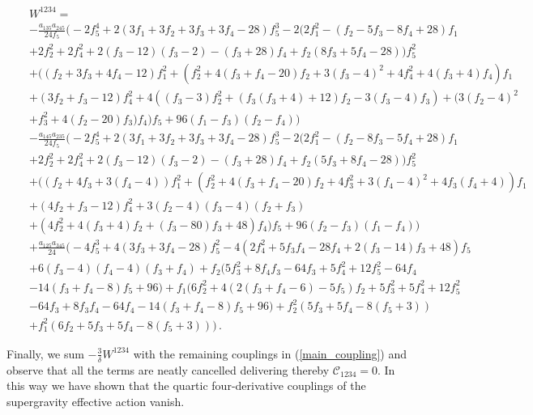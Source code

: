 \documentclass[12pt,a4paper]{article}
\numberwithin{equation}{section}
\newcommand{\bea}{\begin{eqnarray}}
\newcommand{\eea}{\end{eqnarray}}
\def\la{\label}
\def\la{\label}
\begin{document}
{\small
\bea
 &&W^{1234}= \nonumber\\
 && -\frac{a_{135} a_{245} }{24
   f_5}\Big(-2 f_5^4+2 (3 f_1+3 f_2+3 f_3+3 f_4-28) f_5^3-2 (2
   f_1^2-(f_2-5 f_3-8 f_4+28) f_1 \nonumber \\
   &&+2 f_2^2+2 f_4^2+2 (f_3-12)
   (f_3-2)-(f_3+28) f_4+f_2 (8 f_3+5 f_4-28))
   f_5^2  \nonumber  \\
   &&+((f_2+3 f_3+4 f_4-12) f_1^2+(f_2^2+4 (f_3+f_4-20) f_2+3
   (f_3-4)^2+4 f_4^2+4 (f_3+4) f_4) f_1  \nonumber  \\
   &&+(3 f_2+f_3-12)
   f_4^2+4 ((f_3-3) f_2^2+(f_3 (f_3+4)+12) f_2-3
   (f_3-4) f_3)+(3 (f_2-4)^2 \nonumber  \\
   &&+f_3^2+4 (f_2-20)
   f_3) f_4) f_5+96 (f_1-f_3) (f_2-f_4)\Big)   \nonumber \\
   &&-\frac{a_{145} a_{235}}{24 f_5} \Big(-2 f_5^4+2 (3 f_1+3 f_2+3 f_3+3 f_4-28) f_5^3-2
   (2 f_1^2-(f_2-8 f_3-5 f_4+28) f_1 \nonumber \\
   &&+2 f_2^2+2 f_4^2+2 (f_3-12)
   (f_3-2)-(f_3+28) f_4+f_2 (5 f_3+8 f_4-28))
   f_5^2 \nonumber \\
   &&+((f_2+4 f_3+3 (f_4-4)) f_1^2+(f_2^2+4
   (f_3+f_4-20) f_2+4 f_3^2+3 (f_4-4)^2+4 f_3 (f_4+4))
   f_1 \nonumber \\
   &&+(4 f_2+f_3-12) f_4^2+3 (f_2-4) (f_3-4)
   (f_2+f_3) \nonumber \\
   &&+(4 f_2^2+4 (f_3+4) f_2+(f_3-80) f_3+48)
   f_4) f_5+96 (f_2-f_3) (f_1-f_4)\Big) \nonumber \\
  &&+\frac{  a_{125} a_{345}}{24}
  \Big(-4 f_5^3+4 (3 f_3+3 f_4-28) f_5^2-4 (2 f_4^2+5 f_3
   f_4-28 f_4+2 (f_3-14) f_3+48) f_5 \nonumber \\
   &&+6 (f_3-4) (f_4-4)
   (f_3+f_4)+f_2 (5 f_3^2+8 f_4 f_3-64 f_3+5 f_4^2+12 f_5^2-64 f_4 \nonumber \\
   &&-14
   (f_3+f_4-8) f_5+96)+f_1 (6 f_2^2+4 (2 (f_3+f_4-6)-5
   f_5) f_2+5 f_3^2+5 f_4^2+12 f_5^2 \nonumber \\
   &&-64 f_3+8 f_3 f_4-64 f_4-14 (f_3+f_4-8)
   f_5+96)+f_2^2 (5 f_3+5 f_4-8 (f_5+3)) \nonumber \\
   &&+f_1^2 (6 f_2+5 f_3+5
   f_4-8 (f_5+3))\Big)\, .
    \la{W}
 \eea
}
\normalsize

\vskip -0.6cm
\noindent
Finally, we sum $-\frac{3}{\delta}W^{1234}$ with the remaining couplings in (\ref{main_coupling}) and observe
that all the terms are neatly cancelled delivering thereby ${\mathscr C}_{1234}=0$. In this way we have shown that 
the quartic four-derivative couplings of the supergravity effective action vanish.
\end{document}
